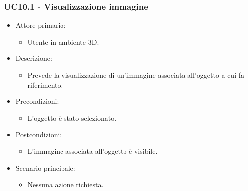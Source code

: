 \subsubsection{UC10.1 - Visualizzazione immagine}
\begin{itemize}
	
	\item Attore primario: 
	\begin{itemize}
		\item Utente in ambiente 3D.
	\end{itemize}
	\item Descrizione:
	\begin{itemize}
		\item Prevede la visualizzazione di un'immagine associata all'oggetto a cui fa riferimento.
	\end{itemize}
	
	\item Precondizioni:
	\begin{itemize}
		\item L'oggetto è stato selezionato.
	\end{itemize}
	
	\item Postcondizioni:
	\begin{itemize}
		\item L'immagine associata all'oggetto è visibile.
	\end{itemize}
	
	\item Scenario principale:
	\begin{itemize}
		\item Nessuna azione richiesta.
	\end{itemize}
	
\end{itemize}

